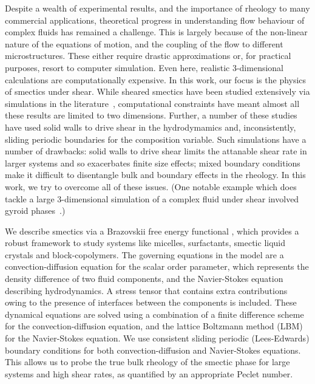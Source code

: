 \documentclass[8.5pt,twoside,twocolumn]{article}
\begin{document}
Despite a wealth of experimental results, and the importance of rheology
to many commercial applications, theoretical progress in understanding
flow behaviour of complex fluids has remained a challenge. This is largely
because of the non-linear nature of the equations of motion, and the
coupling of the flow to different microstructures. These either require
drastic approximations or, for practical purposes, resort to computer
simulation. Even here, realistic 3-dimensional calculations are
computationally expensive.
In this work, our focus is the physics of smectics under shear.
While sheared smectics have been studied extensively via simulations
in the literature~\cite{Swift96,Gonnella97,Gonnella98,Xu03,Xu05,Xu06a,Xu06b},
computational constraints have meant almost all these results are limited
to two dimensions. Further, a number of these studies have used solid walls
to drive shear in the hydrodymamics and, inconsistently, sliding periodic
boundaries for the composition variable. Such simulations have a number of
drawbacks: solid walls to drive shear limits the attanable shear rate in
larger systems and so exacerbates finite size effects; mixed boundary
conditions make it difficult to disentangle bulk and boundary effects
in the rheology. In this work, we try to overcome all of these issues.
(One notable example which does tackle a large 3-dimensional simulation
of a complex fluid under shear involved gyroid phases~\cite{Saksena09}.)

We describe smectics via a Brazovskii free energy functional
\cite{Brazovskii75}, which provides a robust framework to study systems
like micelles, surfactants, smectic liquid crystals and block-copolymers.
The governing equations in the model are a convection-diffusion equation
for the scalar order parameter, which represents the density difference
of two fluid components, and the Navier-Stokes equation describing
hydrodynamics. A stress tensor that contains extra contributions owing
to the presence of interfaces between the components is included.
These dynamical equations are solved using a combination of a finite
difference scheme for the convection-diffusion equation, and the
lattice Boltzmann method (LBM)~\cite{Succi} for the Navier-Stokes equation.
We use consistent sliding periodic (Lees-Edwards) boundary conditions for
both convection-diffusion and Navier-Stokes equations. This allows us to
probe the true bulk rheology of the smectic phase for large systems and
high shear rates, as quantified by an appropriate Peclet number.

\end{document}
